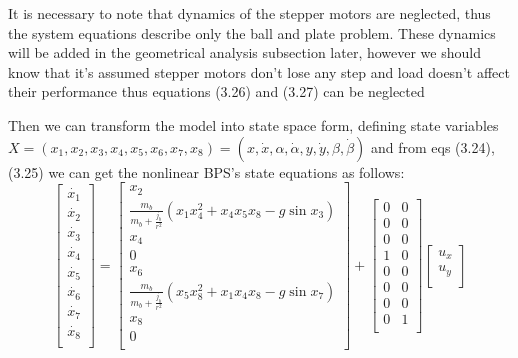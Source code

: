 It is necessary to note that dynamics of the stepper motors are neglected, thus the system equations describe only the ball and plate problem. These dynamics will be added in the geometrical analysis subsection later, however  we should know that it's assumed stepper motors don’t lose any step and load doesn’t
affect their performance thus equations (3.26) and (3.27) can be neglected

Then we can transform the model into state space form, defining state variables $X=(x_1,x_2,x_3,x_4,x_5,x_6,x_7,x_8) = (x,\dot{x},\alpha,\dot{\alpha},y,\dot{y},\beta,\dot{\beta})$
and from eqs (3.24), (3.25) we can get the nonlinear BPS's state equations as follows:\\ 
\begin{equation}
\begin{bmatrix}
\dot{x_1}\\
\dot{x_2}\\
\dot{x_3}\\
\dot{x_4}\\
\dot{x_5}\\
\dot{x_6}\\
\dot{x_7}\\
\dot{x_8}\\
\end{bmatrix}
=
\begin{bmatrix}
x_2\\
\frac{m_b}{m_b+\frac{j_b}{r^2}}(x_1x_4^2+x_4x_5x_8-g\sin{x_3})\\
x_4\\
0\\
x_6\\
\frac{m_b}{m_b+\frac{j_b}{r^2}}(x_5x_8^2+x_1x_4x_8-g\sin{x_7})\\
x_8\\
0\\
\end{bmatrix}
+ 
\begin{bmatrix}
0 & 0 \\
0 & 0 \\
0 & 0 \\
1 & 0 \\
0 & 0 \\
0 & 0 \\
0 & 0 \\
0 & 1 \\
\end{bmatrix}
\begin{bmatrix}
u_x  \\
u_y  \\
\end{bmatrix}
\end{equation}



